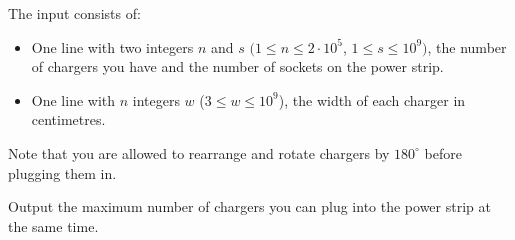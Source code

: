 \begin{Input}
The input consists of:
\begin{itemize}
\item
One line with two integers $n$ and $s$ $(1\leq n\leq2\cdot 10^5$, $1\leq s\leq10^9)$, the number of chargers you have and the number of sockets on the power strip.
\item
One line with $n$ integers $w$ ($3\leq w\leq10^9$),
the width of each charger in centimetres.
\end{itemize}
Note that you are allowed to rearrange and rotate chargers by $180^\circ$ before plugging them in.
\end{Input}

\begin{Output}
Output the maximum number of chargers you can plug into the power strip at the same time.
\end{Output}
